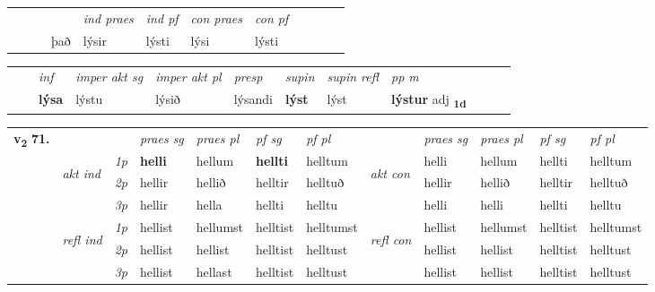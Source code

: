 \begin{tabular}{llllllllllll}
 & &  & &  \textit{ind praes} & \textit{ind pf} & \textit{con praes} & \textit{con pf} \\*
&  & & það & lýsir & lýsti & lýsi & lýsti \\*
\cmidrule{5-9}
\end{tabular}


\begin{tabular}{llllllllllll}
 & & \textit{inf} & \textit{imper akt sg} & \textit{imper akt pl}   & \textit{presp} & \textit{supin} & \textit{supin refl} & \textit{pp m}     \\*
  & & \textbf{lýsa} & lýstu  & lýsið   & lýsandi &  \textbf{lýst} & lýst & \textbf{lýstur} adj \textbf{\textsubscript{1d}} \\*
\cmidrule{1-12}
\end{tabular}



\begin{tabular}{llllllllllll} \toprule
\multirow{4}{*}{{{\textbf{v{\textsubscript{2}}} \Large{\textbf{71.}}}}}  & &   &  \textit{praes sg}  & \textit{praes pl}  &\textit{ pf sg} & \textit{pf pl} &  &  \textit{praes sg}  & \textit{praes pl}  & \textit{pf sg} & \textit{pf pl } \\*
	\cmidrule{4-7} \cmidrule{9-12}
 & \multirow{3}{*}{\begin{turn}{90}\textit{akt ind}\end{turn}} & {\textit{1p}} & \textbf{helli} & hellum    & \textbf{hellti} & helltum & \multirow{3}{*}{\begin{turn}{90}\textit{akt con}\end{turn}} &helli & hellum & hellti & helltum\\*
& &  {\textit{2p}} &  hellir  & hellið   & helltir & helltuð & & hellir & hellið & helltir & helltuð \\*
& &  {\textit{3p}} & hellir & hella   & hellti & helltu & & helli & helli& hellti & helltu  \\*
\cmidrule{4-7} \cmidrule{9-12}
 &\multirow{3}{*}{\begin{turn}{90}\textit{refl ind}\end{turn}} & {\textit{1p}} & hellist & hellumst    & helltist & helltumst & \multirow{3}{*}{\begin{turn}{90}\textit{refl con}\end{turn}}  &hellist & hellumst & helltist & helltumst\\*
 &&  {\textit{2p}} &  hellist  & hellist   & helltist & helltust & &hellist & hellist & helltist & helltust \\*
& &  {\textit{3p}} & hellist & hellast   & helltist & helltust & & hellist & hellist& helltist & helltust  \\*
\cmidrule{4-7} \cmidrule{9-12}
\end{tabular}


